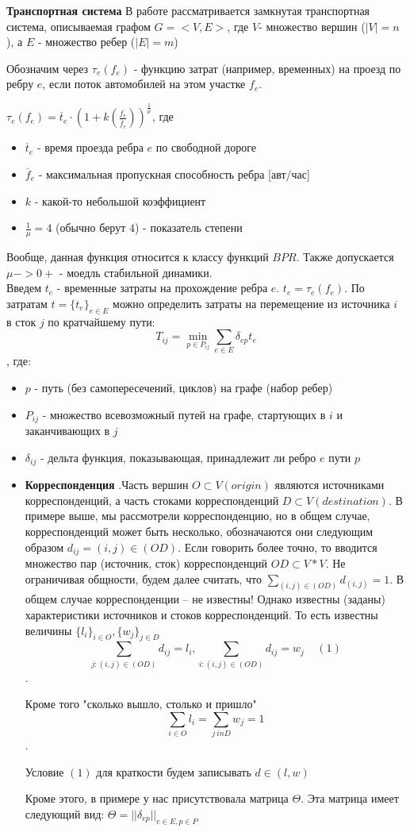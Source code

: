 \documentclass{article}
\begin{document}
\textbf{Транспортная система}
В работе рассматривается замкнутая транспортная система, описываемая графом $G=<V,E>$, где $V$- множество вершин ($|V|=n$), а $E$ - множество ребер ($|E|=m$)

Обозначим через $\tau_e(f_e)$ - функцию затрат (например, временных) на проезд по ребру $e$, если поток автомобилей на этом участке $f_e$.

$\tau_e(f_e) = \overline t_e \cdot (1+ k(\frac{f_e}{\overline f_e}))^{\frac{1}{\mu}}$, где
\begin{itemize}
    \item $\overline t_e$ - время проезда ребра $e$ по свободной дороге
    \item $\overline f_e$ - максимальная пропускная способность ребра [авт/час]
    \item $k$ - какой-то небольшой коэффициент
    \item $\frac{1}{\mu} = 4$ (обычно берут $4$) - показатель степени
\end{itemize}
Вообще, данная функция относится к классу функций $BPR$.
Также допускается $\mu -> 0+$ - моедль стабильной динамики. \\

Введем $t_e$ - временные затраты на прохождение ребра $e$. $t_e = \tau_e(f_e)$. По затратам $t = \{t_e\}_{e \in E}$ можно определить затраты на перемещение из источника $i$ в сток $j$ по кратчайшему пути:
$$T_{ij} = \min_{p \in P_{ij}} \sum_{e \in E} \delta_{ep}t_e$$, где:
\begin{itemize}
    \item $p$ - путь (без самопересечений, циклов) на графе (набор ребер)
    \item $P_{ij}$ - множество всевозможный путей на графе, стартующих в $i$ и заканчивающих в $j$
    \item $\delta_{ij}$ - дельта функция, показывающая, принадлежит ли ребро $e$ пути $p$
    \item \textbf{Корреспонденция} .Часть вершин $O \subset V (origin)$ являются источниками корреспонденций, а часть стоками корреспонденций $D \subset V (destination)$. В примере выше, мы рассмотрели корреспонденцию, но в общем случае, корреспонденций может быть несколько, обозначаются они следующим образом $d_{ij} = (i,j) \in (OD) $. Если говорить более точно, то вводится множество пар (источник, сток) корреспонденций $OD \subset V * V$. Не ограничивая общности, будем далее считать, что $\sum_{(i,j)\in(OD)} d_{(i,j)} = 1$. В общем случае корреспонденции – не известны! Однако известны (заданы) характеристики источников и стоков корреспонденций. То есть известны величины $\{l_i\}_{i \in O}, \{w_j\}_{j \in D}$
    $$\sum_{j: (i,j) \in (OD)} d_{ij} = l_i,  \sum_{i: (i,j) \in (OD)} d_{ij} = w_j \;\;\;\; (1)$$. 
    
    Кроме того "сколько вышло, столько и пришло" $$\sum_{i \in O} l_i = \sum_{j \ in D} w_j = 1$$. 
    
    Условие $(1)$ для краткости будем записывать $d \in (l,w)$
    
    Кроме этого, в примере у нас присутствовала матрица $\Theta$. Эта матрица имеет следующий вид: $\Theta = ||\delta_{ep}||_{e\in E, p \in P}$
\end{itemize} \\
\end{document}
